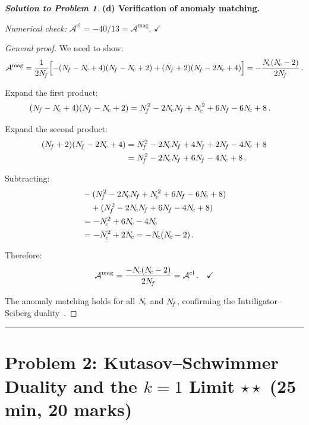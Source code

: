 \documentclass[11pt,a4paper]{article}
\begin{document}
\begin{proof}[\textbf{Solution to Problem 1}]
\bigskip

\textbf{(d) Verification of anomaly matching.}

\textit{Numerical check:}
$\mathcal{A}^{\text{el}} = -40/13 = \mathcal{A}^{\text{mag}}$.
\quad$\checkmark$

\textit{General proof.}  We need to show:
\[
  \mathcal{A}^{\text{mag}}
  = \frac{1}{2\Nf}\Bigl[
    -(\Nf - \Nc + 4)(\Nf - \Nc + 2)
    + (\Nf + 2)(\Nf - 2\Nc + 4)
  \Bigr]
  = -\frac{\Nc(\Nc - 2)}{2\Nf}\,.
\]

Expand the first product:
\begin{align*}
  (\Nf - \Nc + 4)(\Nf - \Nc + 2)
  &= \Nf^2 - 2\Nc\Nf + \Nc^2 + 6\Nf - 6\Nc + 8\,.
\end{align*}

Expand the second product:
\begin{align*}
  (\Nf + 2)(\Nf - 2\Nc + 4)
  &= \Nf^2 - 2\Nc\Nf + 4\Nf + 2\Nf - 4\Nc + 8 \\
  &= \Nf^2 - 2\Nc\Nf + 6\Nf - 4\Nc + 8\,.
\end{align*}

Subtracting:
\begin{align*}
  &-(\Nf^2 - 2\Nc\Nf + \Nc^2 + 6\Nf - 6\Nc + 8) \\
  &\quad + (\Nf^2 - 2\Nc\Nf + 6\Nf - 4\Nc + 8) \\
  &= -\Nc^2 + 6\Nc - 4\Nc \\
  &= -\Nc^2 + 2\Nc = -\Nc(\Nc - 2)\,.
\end{align*}

Therefore:
\[
  \mathcal{A}^{\text{mag}}
  = \frac{-N_{\!c}(N_{\!c} - 2)}{2N_{\!f}}
  = \mathcal{A}^{\text{el}}\,.
  \quad\checkmark
\]

The anomaly matching holds for all $N_{\!c}$ and $N_{\!f}$, confirming the
Intriligator--Seiberg duality~\cite{IS9506101}.

\end{proof}


\bigskip
\hrule
\bigskip


\section*{Problem 2: Kutasov--Schwimmer Duality and the $k = 1$ Limit
  \hfill $\star\star$ \normalsize(25 min, 20 marks)}
\label{prob:KS-duality}
\end{document}
